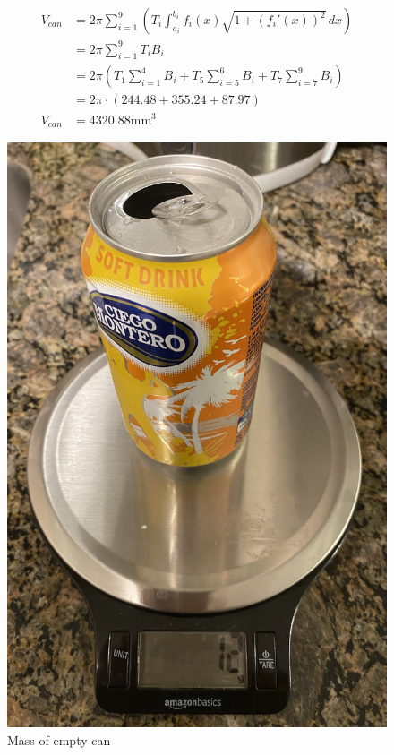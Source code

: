 \documentclass[11pt]{article}
\begin{document}
    \begin{minipage}{.6\linewidth}
        \footnotesize
        \begin{align*}
            V_{can} &= 2 \pi \sum_{i=1}^9 \left( T_i \int_{a_i}^{b_i} f_i(x) \sqrt{1 + (f_i'(x))^2} \, dx \right) \\
            &= 2 \pi \sum_{i=1}^9 T_i B_i \\
            &= 2 \pi \left( T_1 \sum_{i=1}^4 B_i + T_5 \sum_{i=5}^6 B_i + T_7 \sum_{i=7}^9 B_i \right) \\
            &= 2 \pi \cdot (244.48 + 355.24 + 87.97) \\
            V_{can} &= 4320.88 \mathrm{mm}^3
        \end{align*}
    \end{minipage}%
    \begin{minipage}{.4\linewidth}
        \begin{figure}[H]
            \centering
            \includegraphics[width=.7\linewidth]{images/scale_12.JPG}
            \vspace{-10pt}
            \caption{Mass of empty can}
            \label{fig:scale-12}
        \end{figure}
    \end{minipage}
    \vspace{4pt}
\end{document}
